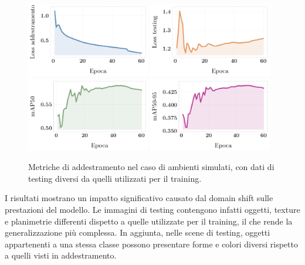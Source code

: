 \documentclass[12pt]{report}
\begin{document}
\begin{figure}[h!]
	\centering
	{\includegraphics[width=0.48\textwidth]{images/domain-shift/sim-to-sim/2/train-loss}}
	\hspace{0.01\textwidth}
	{\includegraphics[width=0.48\textwidth]{images/domain-shift/sim-to-sim/2/testing-loss}}
	\hspace{0.01\textwidth}
	\\
	{\includegraphics[width=0.48\textwidth]{images/domain-shift/sim-to-sim/2/map50}}
	\hspace{0.01\textwidth}
	{\includegraphics[width=0.48\textwidth]{images/domain-shift/sim-to-sim/2/map50-95}}
	\caption{Metriche di addestramento nel caso di ambienti simulati, con dati di testing diversi da quelli utilizzati per il training.}
	\label{fig:training-2}
\end{figure}

I risultati mostrano un impatto significativo causato dal domain shift sulle prestazioni del modello. Le immagini di testing contengono infatti oggetti, texture e planimetrie differenti dispetto a quelle utilizzate per il training, il che rende la generalizzazione più complessa. In aggiunta, nelle scene di testing, oggetti appartenenti a una stessa classe possono presentare forme e colori diversi rispetto a quelli visti in addestramento.
\end{document}
